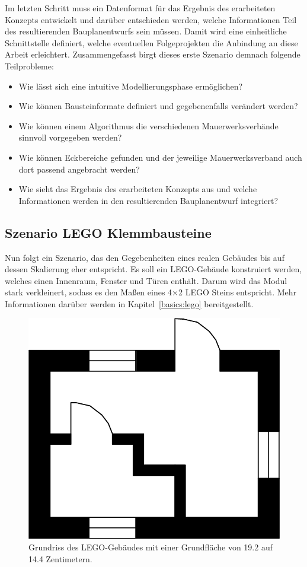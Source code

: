Im letzten Schritt muss ein Datenformat für das Ergebnis des erarbeiteten Konzepts entwickelt und darüber entschieden werden, welche Informationen Teil des resultierenden Bauplanentwurfs sein müssen.
Damit wird eine einheitliche Schnittstelle definiert, welche eventuellen Folgeprojekten die Anbindung an diese Arbeit erleichtert.
Zusammengefasst birgt dieses erste Szenario demnach folgende Teilprobleme:
\begin{itemize}
  \item Wie lässt sich eine intuitive Modellierungsphase ermöglichen?
  \item Wie können Bausteinformate definiert und gegebenenfalls verändert werden?
  \item Wie können einem Algorithmus die verschiedenen Mauerwerksverbände sinnvoll vorgegeben werden?
  \item Wie können Eckbereiche gefunden und der jeweilige Mauerwerksverband auch dort passend angebracht werden?
  \item Wie sieht das Ergebnis des erarbeiteten Konzepts aus und welche Informationen werden in den resultierenden Bauplanentwurf integriert?
\end{itemize}

\subsection{Szenario LEGO Klemmbausteine}\label{scenarios:scenario2}
Nun folgt ein Szenario, das den Gegebenheiten eines realen Gebäudes bis auf dessen Skalierung eher entspricht.
Es soll ein LEGO-Gebäude konstruiert werden, welches einen Innenraum, Fenster und Türen enthält.
Darum wird das Modul stark verkleinert, sodass es den Maßen eines 4$\times$2 LEGO Steins entspricht.
Mehr Informationen darüber werden in Kapitel~\ref{basics:lego} bereitgestellt.

\begin{figure}[ht]
  \centering
  \includegraphics[width=0.5\columnwidth]{fig/scenario2_storey_plan.png}
  \caption{Grundriss des LEGO-Gebäudes mit einer Grundfläche von 19.2 auf 14.4 Zentimetern.}\label{fig:scenarios:Scenario2 Gebaeudeplan}
\end{figure}

